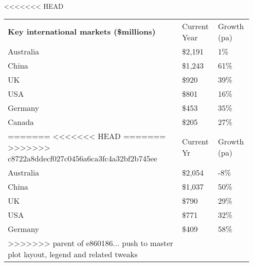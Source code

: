 <<<<<<< HEAD
\begin{tabular}[t]{p{4.85cm}>{\hfill}p{1.3cm}>{\hfill}p{1.35cm}}
 \textbf{Key international markets (\$millions)} & Current Year & Growth (pa) \\ 
 Australia & \$2,191 & 1\% \\ 
  China & \$1,243 & 61\% \\ 
  UK & \$920   & 39\% \\ 
  USA & \$801   & 16\% \\ 
  Germany & \$453   & 35\% \\ 
  Canada & \$205   & 27\% \\ 
=======
<<<<<<< HEAD
=======
>>>>>>> c8722a8ddecf027c0456a6ca3fc4a32bf2b745ee
\begin{tabular}[t]{p{5.1cm}>{\hfill}p{1.1cm}>{\hfill}p{1.3cm}}
 Key international markets (\$million) & Current Yr & Growth (pa) \\ 
 Australia & \$2,054 & -8\% \\ 
  China & \$1,037 & 50\% \\ 
  UK & \$790   & 29\% \\ 
  USA & \$771   & 32\% \\ 
  Germany & \$409   & 58\% \\ 
>>>>>>> parent of e860186... push to master plot layout, legend and related tweaks
  \end{tabular}
